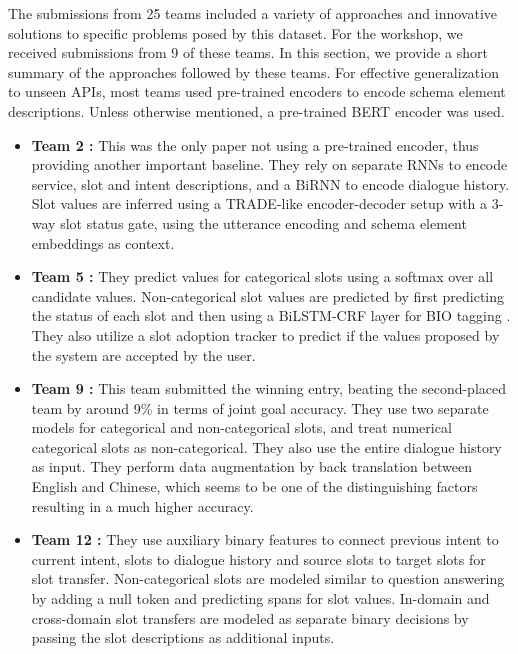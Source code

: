 The submissions from 25 teams included a variety of approaches and innovative solutions to specific problems posed by this dataset. For the workshop, we received submissions from 9 of these teams. In this section, we provide a short summary of the approaches followed by these teams. For effective generalization to unseen APIs, most teams used pre-trained encoders to encode schema element descriptions. Unless otherwise mentioned, a pre-trained BERT \cite{devlin2019bert} encoder was used.

\begin{itemize}
    \item \textbf{Team 2 \cite{lo2020dstc}:} This was the only paper not using a pre-trained encoder, thus providing another important baseline. They rely on separate RNNs to encode service, slot and intent descriptions, and a BiRNN to encode dialogue history. Slot values are inferred using a TRADE-like encoder-decoder setup with a 3-way slot status gate, using the utterance encoding and schema element embeddings as context.
    
    \item \textbf{Team 5 \cite{lei2020dstc}:} They predict values for categorical slots using a softmax over all candidate values. Non-categorical slot values are predicted by first predicting the status of each slot and then using a BiLSTM-CRF layer for BIO tagging \cite{ramshaw1995text}. They also utilize a slot adoption tracker to predict if the values proposed by the system are accepted by the user.

    \item \textbf{Team 9 \cite{ma2020dstc}:} This team submitted the winning entry, beating the second-placed team by around 9\% in terms of joint goal accuracy. They use two separate models for categorical and non-categorical slots, and treat numerical categorical slots as non-categorical. They also use the entire dialogue history as input. They perform data augmentation by back translation between English and Chinese, which seems to be one of the distinguishing factors resulting in a much higher accuracy.
    
    \item \textbf{Team 12 \cite{ruan2020dstc}:} They use auxiliary binary features to connect previous intent to current intent, slots to dialogue history and source slots to target slots for slot transfer. Non-categorical slots are modeled similar to question answering by adding a null token and predicting spans for slot values. In-domain and cross-domain slot transfers are modeled as separate binary decisions by passing the slot descriptions as additional inputs.


\end{itemize}
